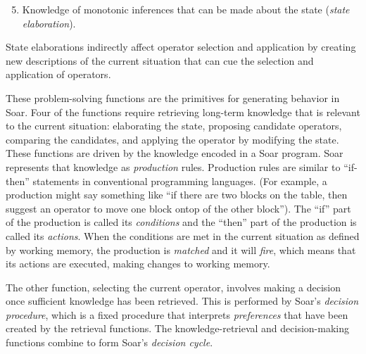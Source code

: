 \begin{description}
\makeatletter
\@newlistfalse
\makeatother
\begin{enumerate} \setcounter{enumi}{4}
\item Knowledge of monotonic inferences that can be made about the state
(\textit{state elaboration}). 
\end{enumerate}
\end{description}
State elaborations indirectly affect operator selection and application
by creating new descriptions of the current situation that can cue
the selection and application of operators.


These problem-solving functions are the primitives for generating behavior
in Soar.  Four of the functions require retrieving long-term knowledge
that is relevant to the current situation: elaborating the state,
proposing candidate operators, comparing the candidates, and applying
the operator by modifying the state. These functions are driven by the
knowledge encoded in a Soar program.  Soar represents that knowledge as
\textit{production} rules.  Production rules are similar to ``if-then''
statements in conventional programming languages. (For example, a
production might say something like ``if there are two blocks on the
table, then suggest an operator to move one block ontop of the other
block'').  The ``if'' part of the production is called its
\textit{conditions} and the ``then'' part of the production is called
its \textit{actions}. When the conditions are met in the current
situation as defined by working memory, the production is \emph{matched}
and it will \emph{fire}, which means that its actions are executed,
making changes to working memory. 

The other function, selecting the current operator, involves making a
decision once sufficient knowledge has been retrieved.  This is
performed by Soar's \emph{decision procedure}, which is a fixed
procedure that interprets \emph{preferences} that have been created by
the retrieval functions. The knowledge-retrieval and decision-making
functions combine to form Soar's \emph{decision cycle}.


